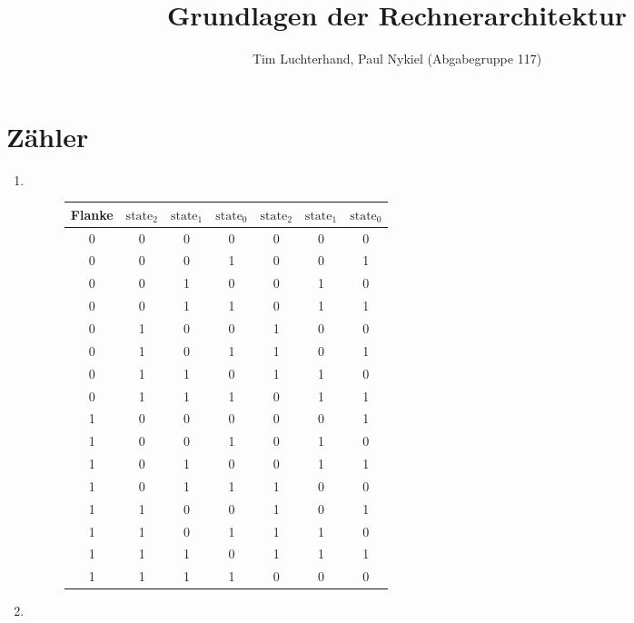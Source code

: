 \documentclass[DIN, pagenumber=false, fontsize=11pt, parskip=half]{scrartcl}
\title{Grundlagen der Rechnerarchitektur}
\author{Tim Luchterhand, Paul Nykiel (Abgabegruppe 117)}
\begin{document}
    \maketitle
    \section{Zähler}
    \begin{enumerate}[label=(\alph*)]
        \item $ $
            \begin{figure}[H]
                \centering
                \begin{tabular}{c|ccc|ccc}
                    \toprule
                    Flanke & $\text{state}_2$ & $\text{state}_1$ & $\text{state}_0$ & $\text{state}_2$ & $\text{state}_1$ & $\text{state}_0$ \\
                    \midrule
                    0 & 0 & 0 & 0 & 0 & 0 & 0\\
                    0 & 0 & 0 & 1 & 0 & 0 & 1\\
                    0 & 0 & 1 & 0 & 0 & 1 & 0\\
                    0 & 0 & 1 & 1 & 0 & 1 & 1\\
                    0 & 1 & 0 & 0 & 1 & 0 & 0\\
                    0 & 1 & 0 & 1 & 1 & 0 & 1\\
                    0 & 1 & 1 & 0 & 1 & 1 & 0\\
                    0 & 1 & 1 & 1 & 0 & 1 & 1\\
                    1 & 0 & 0 & 0 & 0 & 0 & 1\\
                    1 & 0 & 0 & 1 & 0 & 1 & 0\\
                    1 & 0 & 1 & 0 & 0 & 1 & 1\\
                    1 & 0 & 1 & 1 & 1 & 0 & 0\\
                    1 & 1 & 0 & 0 & 1 & 0 & 1\\
                    1 & 1 & 0 & 1 & 1 & 1 & 0\\
                    1 & 1 & 1 & 0 & 1 & 1 & 1\\
                    1 & 1 & 1 & 1 & 0 & 0 & 0\\
                    \bottomrule
                \end{tabular}
            \end{figure}
        \item
            \begin{eqnarray*}

\end{eqnarray*}
\end{enumerate}
\end{document}
